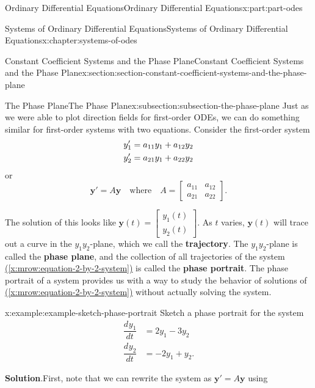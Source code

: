 \documentclass[twoside,10pt,]{book}
\newcommand{\blocktitlefont}{\relax}
\newcommand{\xreffont}{\relax}
\newcommand{\terminology}[1]{\textbf{#1}}
\numberwithin{equation}{part}
\renewcommand{\vec}[1]{\mathbf{#1}}
\providecommand{\dv}[3][]{\dfrac{d^{#1} #2}{d #3^{#1}}}
\newcommand{\amp}{&}
\begin{document}
\begin{partptx}{Ordinary Differential Equations}{}{Ordinary Differential Equations}{}{}{x:part:part-odes}
\begin{chapterptx}{Systems of Ordinary Differential Equations}{}{Systems of Ordinary Differential Equations}{}{}{x:chapter:systems-of-odes}
\begin{sectionptx}{Constant Coefficient Systems and the Phase Plane}{}{Constant Coefficient Systems and the Phase Plane}{}{}{x:section:section-constant-coefficient-systems-and-the-phase-plane}
\typeout{************************************************}
%
\begin{subsectionptx}{The Phase Plane}{}{The Phase Plane}{}{}{x:subsection:subsection-the-phase-plane}
Just as we were able to plot direction fields for first-order ODEs, we can do something similar for first-order systems with two equations. Consider the first-order system%
\begin{align}
y'_{1}  \amp =  a_{11}y_{1} + a_{12}y_{2}\label{x:mrow:equation-2-by-2-system}\\
y'_{2}  \amp =  a_{21}y_{1}+  a_{22}y_{2}\notag
\end{align}
or%
\begin{equation*}
\vec{y}' = A\vec{y}\quad\text{where}\quad A = \begin{bmatrix}a_{11}  \amp  a_{12}  \\  a_{21}  \amp  a_{22}\end{bmatrix}.
\end{equation*}
%
\par
The solution of this looks like \(\vec{y}(t) = \begin{bmatrix}y_{1}(t) \\ y_{2}(t)\end{bmatrix}\). As \(t\) varies, \(\vec{y}(t)\) will trace out a curve in the \(y_{1}y_{2}\)-plane, which we call the \terminology{trajectory}. The \(y_{1}y_{2}\)-plane is called the \terminology{phase plane}, and the collection of all trajectories of the system \hyperref[x:mrow:equation-2-by-2-system]{({\xreffont\ref{x:mrow:equation-2-by-2-system}})} is called the \terminology{phase portrait}. The phase portrait of a system provides us with a way to study the behavior of solutions of \hyperref[x:mrow:equation-2-by-2-system]{({\xreffont\ref{x:mrow:equation-2-by-2-system}})} without actually solving the system.%
\begin{example}{}{x:example:example-sketch-phase-portrait}%
Sketch a phase portrait for the system%
\begin{align*}
\dv{y_{1}}{t}  \amp =  2y_{1} - 3y_{2}\\
\dv{y_{2}}{t}  \amp =  -2y_{1} + y_{2}.
\end{align*}
%
\par\smallskip%
\noindent\textbf{\blocktitlefont Solution}.\hypertarget{g:solution:idp105548817080608}{}\quad{}First, note that we can rewrite the system as \(\vec{y}' = A\vec{y}\) using%
\begin{equation*}

\end{equation*}
\end{example}
\end{subsectionptx}
\end{sectionptx}
\end{chapterptx}
\end{partptx}
\end{document}

